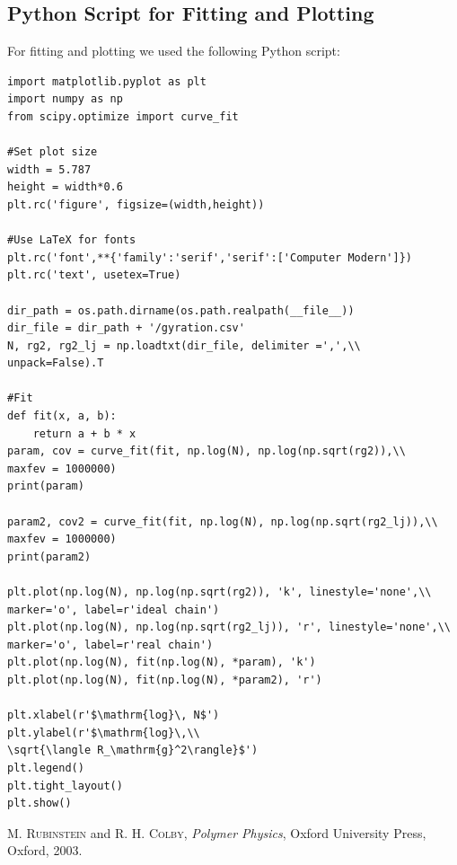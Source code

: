 \documentclass[a4paper,10pt,bibtotoc]{scrartcl}
\begin{document}
\subsection*{Python Script for Fitting and Plotting}
For fitting and plotting we used the following Python script:
\begin{lstlisting}
import matplotlib.pyplot as plt
import numpy as np
from scipy.optimize import curve_fit

#Set plot size
width = 5.787
height = width*0.6
plt.rc('figure', figsize=(width,height))

#Use LaTeX for fonts
plt.rc('font',**{'family':'serif','serif':['Computer Modern']})
plt.rc('text', usetex=True)

dir_path = os.path.dirname(os.path.realpath(__file__))
dir_file = dir_path + '/gyration.csv'
N, rg2, rg2_lj = np.loadtxt(dir_file, delimiter =',',\\
unpack=False).T

#Fit
def fit(x, a, b):
    return a + b * x
param, cov = curve_fit(fit, np.log(N), np.log(np.sqrt(rg2)),\\
maxfev = 1000000)
print(param)

param2, cov2 = curve_fit(fit, np.log(N), np.log(np.sqrt(rg2_lj)),\\
maxfev = 1000000)
print(param2)

plt.plot(np.log(N), np.log(np.sqrt(rg2)), 'k', linestyle='none',\\
marker='o', label=r'ideal chain')
plt.plot(np.log(N), np.log(np.sqrt(rg2_lj)), 'r', linestyle='none',\\
marker='o', label=r'real chain')
plt.plot(np.log(N), fit(np.log(N), *param), 'k')
plt.plot(np.log(N), fit(np.log(N), *param2), 'r')

plt.xlabel(r'$\mathrm{log}\, N$')
plt.ylabel(r'$\mathrm{log}\,\\
\sqrt{\langle R_\mathrm{g}^2\rangle}$')
plt.legend()
plt.tight_layout()
plt.show()
\end{lstlisting}

\begin{thebibliography}{9}
		
		\textsc{M. Rubinstein} and \textsc{R. H. Colby},
		\emph{Polymer Physics},
		Oxford University Press,
		Oxford,
		2003.


\end{thebibliography}
\end{document}
